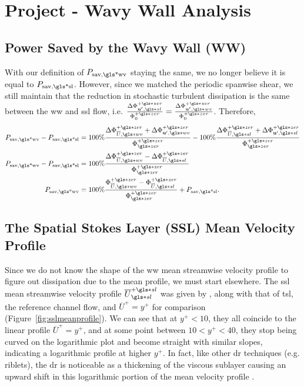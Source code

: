 \chapter{Project - Wavy Wall Analysis}\glsresetall
\section{Power Saved by the Wavy Wall (WW)}
With our definition of $P_\text{sav,\gls*{wv}}$ staying the same, we no longer believe it is equal to $P_\text{sav,\gls*{sl}}$. However, since we matched the periodic spanwise shear, we still maintain that the reduction in stochastic turbulent dissipation is the same between the \gls*{ww} and \gls*{ssl} flow, i.e. $\frac{\Delta \Phi _{\mathbf{u} ',\gls*{sl}}\pz}{\Phi _{0}\pz}=\frac{\Delta \Phi _{\mathbf{u} ',\gls*{wv}}\pz}{\Phi _{0}\pz}$. Therefore,
\begin{align}
	P_\text{sav,\gls*{wv}}	-P_\text{sav,\gls*{sl}} &= 100\%\frac{\Delta \Phi _{\overline{U },\gls*{wv}}\pz+\Delta \Phi _{\mathbf{u} ',\gls*{wv}}\pz}{\Phi \zz\pz}-100\% \frac{\Delta \Phi _{\overline{U },\gls*{sl}}\pz+\Delta \Phi _{\mathbf{u} ',\gls*{sl}}\pz}{\Phi \zz\pz}\\
	P_\text{sav,\gls*{wv}}	-P_\text{sav,\gls*{sl}}  &= 100\% \frac{\Delta \Phi _{\overline{U },\gls*{wv}}\pz-\Delta \Phi _{\overline{U },\gls*{sl}}\pz}{\Phi \zz\pz}\\
	P_\text{sav,\gls*{wv}} &= 100\% \frac{ \Phi _{\overline{U },\gls*{wv}}\pz-\Phi _{\overline{U },\gls*{sl}}\pz}{\Phi \zz\pz}+P_\text{sav,\gls*{sl}}
.\end{align}


\section{The Spatial Stokes Layer (SSL) Mean Velocity Profile}\label{sec:sslmean}
Since we do not know the shape of the \gls*{ww} mean streamwise velocity profile to figure out dissipation due to the mean profile, we must start elsewhere. The \gls*{ssl} mean streamwise velocity profile $\overline{U}\ssl\ps$ was given by \vqt, along with that of \gls*{tsl}, the reference channel flow, and $\overline{U}^{+}=y^{+}$ for comparison (Figure~\ref{fig:sslmeanprofile}). We can see that at $y^{+}<10$, they all coincide to the linear profile $\overline{U}^{+}=y^{+}$, and at some point between $10<y^{+}<40$, they stop being curved on the logarithmic plot and become straight with similar slopes, indicating a logarithmic profile at higher $y^{+}$. In fact, like other \gls*{dr} techniques (e.g. riblets), the \gls*{dr} is noticeable as a thickening of the viscous sublayer causing an upward shift in this logarithmic portion of the mean velocity profile \cite{viotti2009,choi1989,luchini1996}. 

